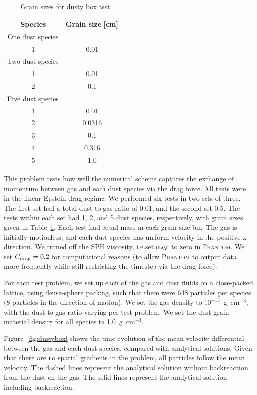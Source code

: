 \documentclass[fleqn,usenatbib]{mnras}
\begin{document}
\begin{table}
   \centering
   \begin{tabular}{ccc}
      \hline
      \hline
      Species & Grain size [cm] \\
      \hline
      \hline
      One dust species \\
      1 & 0.01 \\
      \hline
      Two dust species \\
      1 & 0.01 \\
      2 & 0.1 \\
      \hline
      Five dust species \\
      1 & 0.01 \\
      2 & 0.0316 \\
      3 & 0.1 \\
      4 & 0.316 \\
      5 & 1.0 \\
      \hline
      \hline
   \end{tabular}
   \caption{Grain sizes for dusty box test.}%
   \label{tab:box}
\end{table}

This problem tests how well the numerical scheme captures the exchange of
momentum between gas and each dust species via the drag force. All tests were in
the linear Epstein drag regime. We performed six tests in two sets of three. The
first set had a total dust-to-gas ratio of 0.01, and the second set 0.5. The
tests within each set had 1, 2, and 5 dust species, respectively, with grain
sizes given in Table~\ref{tab:box}. Each test had equal mass in each grain size
bin. The gas is initially motionless, and each dust species has uniform velocity
in the positive x-direction. We turned off the SPH viscosity, i.e.\@ set
\(\alpha_{\rm AV}\) to zero in \textsc{Phantom}. We set \(C_{\rm drag} = 0.2\)
for computational reasons (to allow \textsc{Phantom} to output data more
frequently while still restricting the timestep via the drag force).

For each test problem, we set up each of the gas and dust fluids on a
close-packed lattice, using dense-sphere packing, such that there were 648
particles per species (8 particles in the direction of motion). We set the gas
density to \(10^{-13}\)~g~cm\({}^{-3}\), with the dust-to-gas ratio varying per
test problem. We set the dust grain material density for all species to
1.0~g~cm\({}^{-3}\).

Figure~\ref{fig:dustybox} shows the time evolution of the mean velocity
differential between the gas and each dust species, compared with analytical
solutions. Given that there are no spatial gradients in the problem, all
particles follow the mean velocity. The dashed lines represent the analytical
solution without backreaction from the dust on the gas. The solid lines
represent the analytical solution including backreaction.
\end{document}

